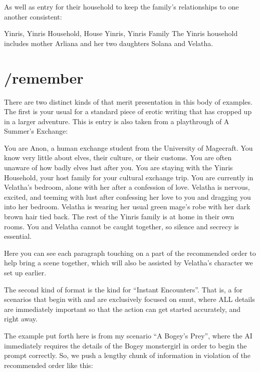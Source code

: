 \documentclass[Coomer-main.tex]{subfiles}
\begin{document}
As well as \wi entry for their household to keep the family’s relationships to one another consistent:

\begin{WI}{Yinris, Yinris Household, House Yinris, Yinris Family}
The Yinris household includes mother Arliana and her two daughters Solana and Velatha.
\end{WI}

\section{/remember}

There are two distinct kinds of \rem that merit presentation in this body of examples. The first is your usual \rem for a standard piece of erotic writing that has cropped up in a larger adventure. This is entry is also taken from a playthrough of A Summer’s Exchange:

\begin{/rm}
You are Anon, a human exchange student from the University of Magecraft. You know very little about elves, their culture, or their customs. You are often unaware of how badly elves lust after you. You are staying with the Yinris Household, your host family for your cultural exchange trip.
\smallskip
You are currently in Velatha’s bedroom, alone with her after a confession of love.
\smallskip
Velatha is nervous, excited, and teeming with lust after confessing her love to you and dragging you into her bedroom. Velatha is wearing her usual green mage’s robe with her dark brown hair tied back.
\smallskip
The rest of the Yinris family is at home in their own rooms. You and Velatha cannot be caught together, so silence and secrecy is essential.
\end{/rm}

Here you can see each paragraph touching on a part of the recommended order to help bring a scene together, which will also be assisted by Velatha’s character \wi we set up earlier.

The second kind of \rem format is the kind for “Instant Encounters”. That is, a \rem for scenarios that begin with and are exclusively focused on smut, where ALL details are immediately important so that the action can get started accurately, and right away.

The example put forth here is from my scenario “A Bogey’s Prey”, where the AI immediately requires the details of the Bogey monstergirl in order to begin the prompt correctly. So, we push a lengthy chunk of information in violation of the recommended order like this:
\end{document}
